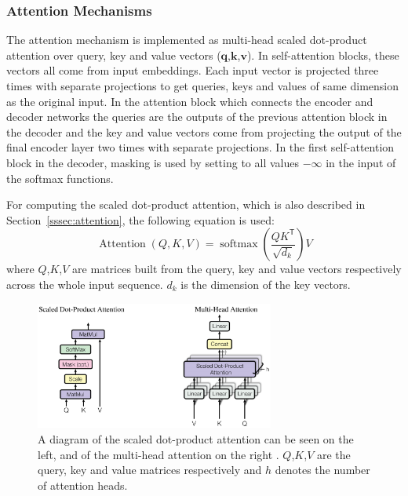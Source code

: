 \documentclass[12pt]{article}
\DeclareMathOperator{\Attention}{Attention}
\DeclareMathOperator{\softmax}{softmax}
\begin{document}
\subsubsection{Attention Mechanisms} \label{sssec:trf_attention}
The attention mechanism is implemented as multi-head scaled dot-product attention over query, key and value vectors (\(\bm{q}\),\(\bm{k}\),\(\bm{v}\)). In self-attention blocks, these vectors all come from input embeddings. Each input vector is projected three times with separate projections to get queries, keys and values of same dimension as the original input. In the attention block which connects the encoder and decoder networks the queries are the outputs of the previous attention block in the decoder and the key and value vectors come from projecting the output of the final encoder layer two times with separate projections. In the first self-attention block in the decoder, masking is used by setting to all values \(-\infty\) in the input of the softmax functions.

For computing the scaled dot-product attention, which is also described in Section~\ref{sssec:attention}, the following equation is used:
\begin{equation}
\Attention(Q,K,V)=\softmax\left(\frac{QK^\mathsf{T}}{\sqrt{d_k}}\right)V
\end{equation}
where \(Q\),\(K\),\(V\) are matrices built from the query, key and value vectors respectively across the whole input sequence. \(d_k\) is the dimension of the key vectors.

\begin{figure}[H] 
	\centering
	\includegraphics[width=0.7\textwidth]{pics/trf_attention.png}
	\caption{A diagram of the scaled dot-product attention can be seen on the left, and of the multi-head attention on the right \cite{Vaswani:2017}. \(Q\),\(K\),\(V\) are the query, key and value matrices respectively and \(h\) denotes the number of attention heads.}
	\label{fig:trf_attention}
\end{figure}
\end{document}
